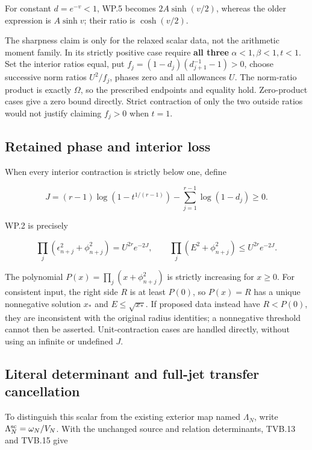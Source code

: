 For constant \(d=e^{-v}<1\), WP.5 becomes \(2A\sinh(v/2)\), whereas the older expression is \(A\sinh v\); their ratio is \(\cosh(v/2)\).

The sharpness claim is only for the relaxed scalar data, not the arithmetic moment family. In its strictly positive case require \textbf{all three} \(\alpha<1,\beta<1,t<1\). Set the interior ratios equal, put \(f_j=(1-d_j)(d_{j+1}^{-1}-1)>0\), choose successive norm ratios \(U^2/f_j\), phases zero and all allowances \(U\). The norm-ratio product is exactly \(\Omega\), so the prescribed endpoints and equality hold. Zero-product cases give a zero bound directly. Strict contraction of only the two outside ratios would not justify claiming \(f_j>0\) when \(t=1\).

\subsection[\hspace{0.4em}Retained phase and interior loss]{Retained phase and interior loss}\label{window-product-retained-phase-and-interior-loss}

When every interior contraction is strictly below one, define

\[
J=(r-1)\log(1-t^{1/(r-1)})-\sum_{j=1}^{r-1}\log(1-d_j)\ge0.
\]

WP.2 is precisely

\[
\prod_j(\epsilon_{n+j}^2+\phi_{n+j}^2)=U^{2r}e^{-2J},\qquad
\prod_j(E^2+\phi_{n+j}^2)\le U^{2r}e^{-2J}. \tag{WP.7}
\]

The polynomial \(P(x)=\prod_j(x+\phi_{n+j}^2)\) is strictly increasing for \(x\ge0\). For consistent input, the right side \(R\) is at least \(P(0)\), so \(P(x)=R\) has a unique nonnegative solution \(x_*\) and \(E\le\sqrt{x_*}\). If proposed data instead have \(R<P(0)\), they are inconsistent with the original radius identities; a nonnegative threshold cannot then be asserted. Unit-contraction cases are handled directly, without using an infinite or undefined \(J\).

\subsection[\hspace{0.4em}Literal determinant and full-jet transfer cancellation]{Literal determinant and full-jet transfer cancellation}\label{window-product-literal-determinant-and-full-jet-transfer-cancellation}

To distinguish this scalar from the existing exterior map named \(\Lambda_N\), write \(\Lambda_N^{\rm sc}=\omega_N/V_N\). With the unchanged source and relation determinants, TVB.13 and TVB.15 give

